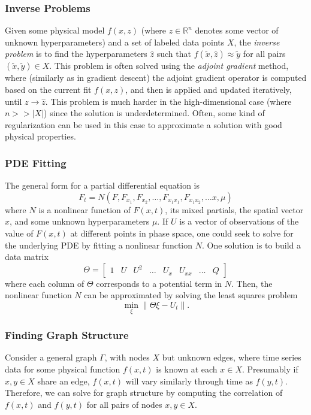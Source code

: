 \documentclass[12pt]{article}
\begin{document}
\subsubsection*{Inverse Problems}
Given some physical model $f(x,z)$ (where $z\in\mathbb{R}^n$ denotes some
vector of unknown hyperparameters) and a set of labeled data points $X$,
the {\it inverse problem} is to find the hyperparameters ${\hat z}$ such
that $f({\tilde x}, {\hat z}) \approx {\tilde y}$ for all pairs
$({\tilde x}, {\tilde y}) \in X$. This problem is often solved using the
{\it adjoint gradient} method, where (similarly as in gradient descent)
the adjoint gradient operator is computed based on the current fit
$f(x,z)$, and then is applied and updated iteratively, until
$z \rightarrow {\hat z}$.
This problem is much harder in the high-dimensional case (where
$n >> |X|$) since the solution is underdetermined.
Often, some kind of regularization can be used in this case to approximate
a solution with good physical properties.

\subsubsection*{PDE Fitting}
The general form for a partial differential equation is
$$
F_t = N(F, F_{x_1}, F_{x_2}, \ldots, F_{x_1 x_1}, F_{x_1 x_2}, \ldots x, \mu)
$$
where $N$ is a nonlinear function of $F(x,t)$, its mixed partials, the
spatial vector $x$, and some unknown hyperparameters $\mu$.
If $U$ is a vector of observations of the value of $F(x,t)$ at different
points in phase space, one could seek to solve for the underlying PDE by
fitting a nonlinear function $N$.
One solution is to build a data matrix
$$
\Theta = \left[
	\begin{array}{cccccccc}
		1 & U & U^2 & \ldots & U_x & U_{xx} & \ldots & Q
	\end{array}
\right]
$$
where each column of $\Theta$ corresponds to a potential term in $N$.
Then, the nonlinear function $N$ can be approximated by solving the
least squares problem
$$
\min_\xi \|\Theta \xi - U_t\|.
$$

\subsubsection*{Finding Graph Structure}
Consider a general graph $\Gamma$, with nodes $X$ but unknown edges,
where time series data for some physical function $f(x,t)$ is known at
each $x\in X$.
Presumably if $x,y \in X$ share an edge, $f(x,t)$ will vary similarly
through time as $f(y,t)$.
Therefore, we can solve for graph structure by computing the correlation
of $f(x,t)$ and $f(y,t)$ for all pairs of nodes $x,y \in X$.
\end{document}
